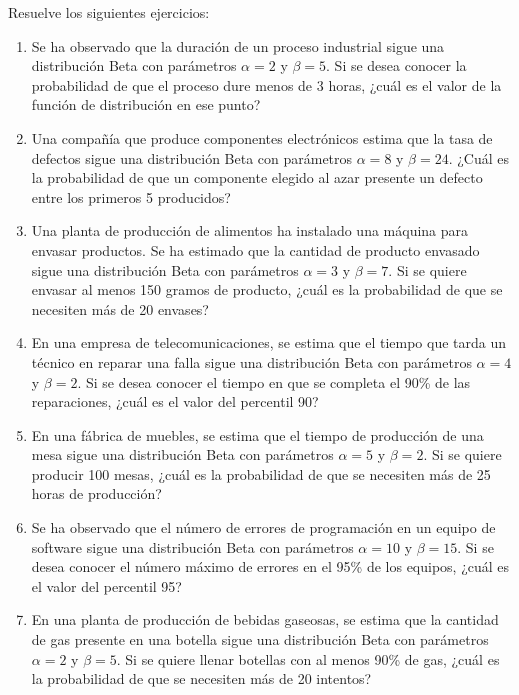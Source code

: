 \begin{Ejer}
Resuelve los siguientes ejercicios:
\begin{enumerate}


\item Se ha observado que la duración de un proceso industrial sigue una distribución Beta con parámetros $\alpha=2$ y $\beta=5$. Si se desea conocer la probabilidad de que el proceso dure menos de 3 horas, ¿cuál es el valor de la función de distribución en ese punto?

\item Una compañía que produce componentes electrónicos estima que la tasa de defectos sigue una distribución Beta con parámetros $\alpha=8$ y $\beta=24$. ¿Cuál es la probabilidad de que un componente elegido al azar presente un defecto entre los primeros 5 producidos?

\item Una planta de producción de alimentos ha instalado una máquina para envasar productos. Se ha estimado que la cantidad de producto envasado sigue una distribución Beta con parámetros $\alpha=3$ y $\beta=7$. Si se quiere envasar al menos 150 gramos de producto, ¿cuál es la probabilidad de que se necesiten más de 20 envases?

\item En una empresa de telecomunicaciones, se estima que el tiempo que tarda un técnico en reparar una falla sigue una distribución Beta con parámetros $\alpha=4$ y $\beta=2$. Si se desea conocer el tiempo en que se completa el 90\% de las reparaciones, ¿cuál es el valor del percentil 90?

\item En una fábrica de muebles, se estima que el tiempo de producción de una mesa sigue una distribución Beta con parámetros $\alpha=5$ y $\beta=2$. Si se quiere producir 100 mesas, ¿cuál es la probabilidad de que se necesiten más de 25 horas de producción?

\item Se ha observado que el número de errores de programación en un equipo de software sigue una distribución Beta con parámetros $\alpha=10$ y $\beta=15$. Si se desea conocer el número máximo de errores en el 95\% de los equipos, ¿cuál es el valor del percentil 95?

\item En una planta de producción de bebidas gaseosas, se estima que la cantidad de gas presente en una botella sigue una distribución Beta con parámetros $\alpha=2$ y $\beta=5$. Si se quiere llenar botellas con al menos 90\% de gas, ¿cuál es la probabilidad de que se necesiten más de 20 intentos?


\end{enumerate}
\end{Ejer}
